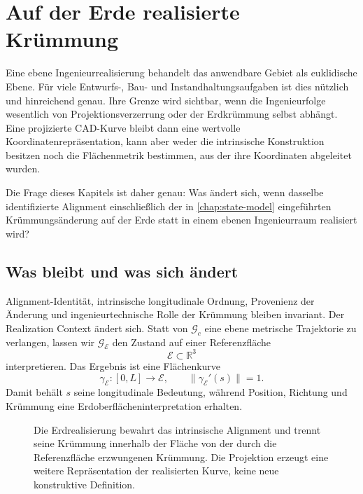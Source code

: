 
\chapter{Auf der Erde realisierte Krümmung}
\label{chapter:ellipsoid_curvature}

Eine ebene Ingenieurrealisierung behandelt das anwendbare Gebiet als
euklidische Ebene. Für viele Entwurfs-, Bau- und Instandhaltungsaufgaben ist
dies nützlich und hinreichend genau. Ihre Grenze wird sichtbar, wenn die
Ingenieurfolge wesentlich von Projektionsverzerrung oder der Erdkrümmung selbst
abhängt. Eine projizierte CAD-Kurve bleibt dann eine wertvolle
Koordinatenrepräsentation, kann aber weder die intrinsische Konstruktion
besitzen noch die Flächenmetrik bestimmen, aus der ihre Koordinaten abgeleitet
wurden.

Die Frage dieses Kapitels ist daher genau: Was ändert sich, wenn dasselbe
identifizierte Alignment einschließlich der in \cref{chap:state-model}
eingeführten Krümmungsänderung auf der Erde statt in einem ebenen
Ingenieurraum realisiert wird?

\section{Was bleibt und was sich ändert}

Alignment-Identität, intrinsische longitudinale Ordnung, Provenienz der
Änderung und ingenieurtechnische Rolle der Krümmung bleiben invariant. Der
Realization Context ändert sich. Statt von \(\mathcal G_c\) eine ebene
metrische Trajektorie zu verlangen, lassen wir \(\mathcal G_{\mathcal E}\)
den Zustand auf einer Referenzfläche
\[
\mathcal E\subset\mathbb R^3
\]
interpretieren. Das Ergebnis ist eine Flächenkurve
\[
\gamma_{\mathcal E}:[0,L]\rightarrow\mathcal E,
\qquad \lVert\gamma_{\mathcal E}'(s)\rVert=1.
\]
Damit behält \(s\) seine longitudinale Bedeutung, während Position, Richtung
und Krümmung eine Erdoberflächeninterpretation erhalten.

\begin{figure}[htbp]
\centering

\caption{Die Erdrealisierung bewahrt das intrinsische Alignment und trennt
seine Krümmung innerhalb der Fläche von der durch die Referenzfläche
erzwungenen Krümmung. Die Projektion erzeugt eine weitere Repräsentation der
realisierten Kurve, keine neue konstruktive Definition.}
\label{fig:earth-realization-decomposition}
\end{figure}

